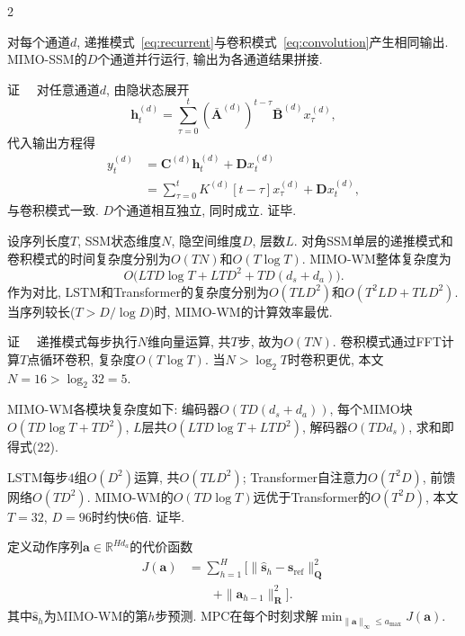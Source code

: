 \begin{multicols}{2}
\begin{Thm}
\label{thm:equiv}
对每个通道$d$, 递推模式~\eqref{eq:recurrent}与卷积模式~\eqref{eq:convolution}产生相同输出.
MIMO-SSM的$D$个通道并行运行, 输出为各通道结果拼接.
\end{Thm}

{证}~~
对任意通道$d$, 由隐状态展开
\begin{equation}
{\bm h}_t^{(d)} = \sum_{\tau=0}^{t} (\bar{{\bm A}}^{(d)})^{t-\tau} \bar{{\bm B}}^{(d)} x_\tau^{(d)},
\end{equation}
代入输出方程得
\begin{equation}
\begin{aligned}
y_t^{(d)} &= {\bm C}^{(d)}{\bm h}_t^{(d)} + {\bm D}x_t^{(d)} \\
&= \sum_{\tau=0}^{t} K^{(d)}[t{-}\tau] x_\tau^{(d)} + {\bm D}x_t^{(d)},
\end{aligned}
\end{equation}
与卷积模式一致. $D$个通道相互独立, 同时成立. 证毕.
\begin{Thm}
\label{thm:complexity}
设序列长度$T$, SSM状态维度$N$, 隐空间维度$D$, 层数$L$.
对角SSM单层的递推模式和卷积模式的时间复杂度分别为$O(TN)$和$O(T\log T)$.
MIMO-WM整体复杂度为
\begin{equation}
O\big(LTD\log T + LTD^2 + TD(d_s+d_a)\big).
\end{equation}
作为对比, LSTM和Transformer的复杂度分别为$O(TLD^2)$和$O(T^2LD+TLD^2)$.
当序列较长($T > D/\log D$)时, MIMO-WM的计算效率最优.
\end{Thm}

{证}~~
递推模式每步执行$N$维向量运算, 共$T$步, 故为$O(TN)$.
卷积模式通过FFT计算$T$点循环卷积, 复杂度$O(T\log T)$.
当$N > \log_2 T$时卷积更优, 本文$N=16 > \log_2 32 = 5$.

MIMO-WM各模块复杂度如下:
编码器$O(TD(d_s+d_a))$, 每个MIMO块$O(TD\log T + TD^2)$,
$L$层共$O(LTD\log T + LTD^2)$, 解码器$O(TDd_s)$,
求和即得式(22).

LSTM每步$4$组$O(D^2)$运算, 共$O(TLD^2)$;
Transformer自注意力$O(T^2D)$, 前馈网络$O(TD^2)$.
MIMO-WM的$O(TD\log T)$远优于Transformer的$O(T^2D)$,
本文$T=32$, $D=96$时约快$6$倍.
证毕.

\begin{Def}
\label{def:cem_cost}
定义动作序列${\bm a} \in \mathbb{R}^{Hd_a}$的代价函数
\begin{equation}
\begin{aligned}
J({\bm a}) &= \sum_{h=1}^{H}\Big[\|\hat{{\bm s}}_{h} - {\bm s}_{\text{ref}}\|_{{\bm Q}}^2 \\
&\qquad + \|{\bm a}_{h-1}\|_{{\bm R}}^2\Big].
\end{aligned}
\end{equation}
其中$\hat{{\bm s}}_{h}$为MIMO-WM的第$h$步预测.
MPC在每个时刻求解$\min_{\|{\bm a}\|_\infty \leqslant a_{\max}} J({\bm a})$.
\end{Def}


\end{multicols}
